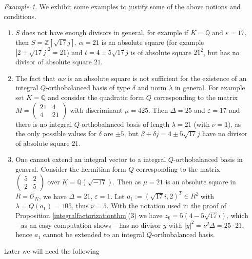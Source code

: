 \documentclass[11pt]{amsart}
\theoremstyle{definition}
\theoremstyle{remark}
\newtheorem{example}[proposition]{Example}
\begin{document}
\begin{example} We exhibit some examples to justify some of the above notions and conditions.
\begin{enumerate}
\item $S$ does not have enough divisors in general, for example if $K=\mathbb Q$ and $\varepsilon=17$, then $S=\mathbb Z[\sqrt{17}j]$, $\alpha=21$ is an absolute square (for example $|2+\sqrt{17}j|^2=21$) and $t=4\pm5\sqrt{17}j$ is of absolute square $21^2$, but has no divisor of absolute square $21$.
\item The fact that $\alpha\nu$ is an absolute square is not sufficient for the existence of an integral $Q$-orthobalanced basis of type $\delta$ and norm $\lambda$ in general. For example set $K=\mathbb Q$ and consider the quadratic form $Q$ corresponding to the matrix $M=\left(\begin{smallmatrix}21 & 4 \\ 4 & 21\end{smallmatrix}\right)$ with discriminant $\mu=425$. Then $\Delta=25$ and $\varepsilon=17$ and there is no integral $Q$-orthobalanced basis of length $\lambda=21$ (with $\nu=1$), as the only possible values for $\delta$ are $\pm5$, but $\beta+\delta j=4\pm5\sqrt{17}j$ have no divisor of absolute square $21$.
\item One cannot extend an integral vector to a integral $Q$-orthobalanced basis in general. Consider the hermitian form $Q$ corresponding to the matrix $\left(\begin{smallmatrix}5 & 2 \\ 2 & 5\end{smallmatrix}\right)$ over $K=\mathbb Q(\sqrt{-17})$. Then as $\mu=21$ is an absolute square in $R=\mathcal O_K$, we have $\Delta=21$, $\varepsilon=1$. Let $a_1:=(\sqrt{17}i,2)^T\in R^2$ with $\lambda=Q(a_1)=105$, thus $\nu=5$. With the notation used in the proof of Proposition \ref{integralfactorizationthm}(3) we have $z_0=5(4-5\sqrt{17}i)$, which -- as an easy computation shows -- has no divisor $y$ with $|y|^2=\nu^2\Delta=25\cdot 21$, hence $a_1$ cannot be extended to an integral $Q$-orthobalanced basis.
\end{enumerate}
\end{example}

Later we will need the following
\end{document}
